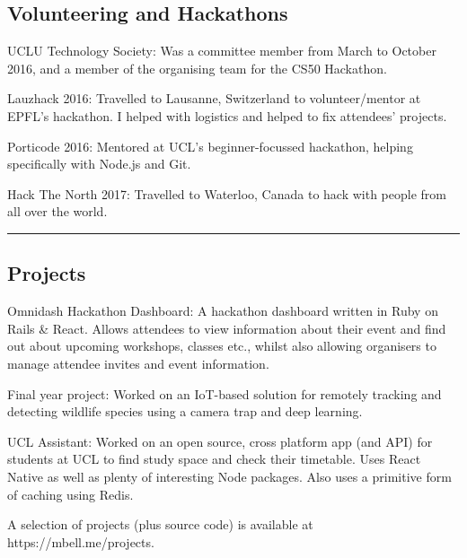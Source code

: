 \documentclass[11pt,a4paper]{article}
\newenvironment{indentsection}[1]%
{\begin{list}{}%
	{\setlength{\leftmargin}{#1}}%
	\item[]%
}
{\end{list}}
\begin{document}
\subsection*{Volunteering and Hackathons}
\begin{indentsection}{\parindent}
\begin{description*}
	\item[UCLU Technology Society:] Was a committee member from March to October 2016, and a member of the organising team for the CS50 Hackathon.
	\item[Lauzhack 2016:] Travelled to Lausanne, Switzerland to volunteer/mentor at EPFL's hackathon. I helped with logistics and helped to fix attendees' projects.
	\item[Porticode 2016:] Mentored at UCL's beginner-focussed hackathon, helping specifically with Node.js and Git.
	\item[Hack The North 2017:] Travelled to Waterloo, Canada to hack with people from all over the world.
\end{description*}
\end{indentsection}
\vspace{-0.4em}
\hrule

\vspace{-1.2em}
\subsection*{Projects}
\begin{indentsection}{\parindent}
	\begin{description*}
		\item[Omnidash Hackathon Dashboard:]
		    A hackathon dashboard written in Ruby on Rails \& React. Allows attendees to view information about their event and find out about upcoming workshops, classes etc., whilst also allowing organisers to manage attendee invites and event information.
		\item[Final year project:]
		Worked on an IoT-based solution for remotely tracking and detecting wildlife species using a camera trap and deep learning.
		\item[UCL Assistant:] Worked on an open source, cross platform app (and API) for students at UCL to find study space and check their timetable. Uses React Native as well as plenty of interesting Node packages. Also uses a primitive form of caching using Redis.
	\end{description*}
	A selection of projects (plus source code) is available at https://mbell.me/projects.
\end{indentsection}
\end{document}
